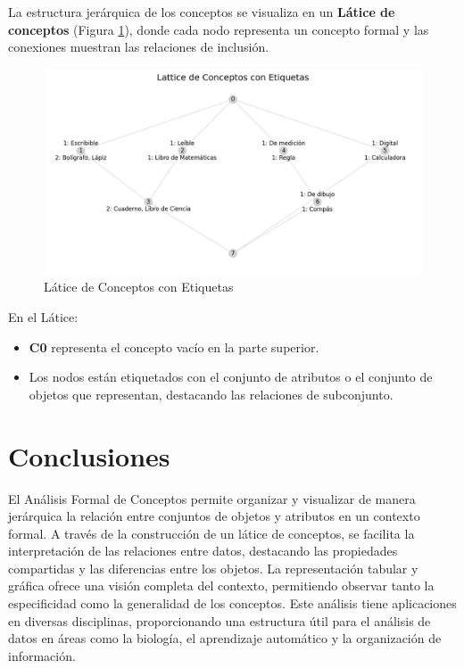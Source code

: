 La estructura jerárquica de los conceptos se visualiza en un \textbf{Látice de conceptos} (Figura \ref{fig:lattice_view}), donde cada nodo representa un concepto formal y las conexiones muestran las relaciones de inclusión.

\begin{figure}[H]
  \centering
  \includegraphics[width=\textwidth]{Figures/1. Content/lattice_view.png}
  \caption{Látice de Conceptos con Etiquetas}
  \label{fig:lattice_view}
\end{figure}

En el Látice:
\begin{itemize}
    \item \textbf{C0} representa el concepto vacío en la parte superior.
    \item Los nodos están etiquetados con el conjunto de atributos o el conjunto de objetos que representan, destacando las relaciones de subconjunto.
\end{itemize}

\section{Conclusiones}

El Análisis Formal de Conceptos permite organizar y visualizar de manera jerárquica la relación entre conjuntos de objetos y atributos en un contexto formal. A través de la construcción de un látice de conceptos, se facilita la interpretación de las relaciones entre datos, destacando las propiedades compartidas y las diferencias entre los objetos. La representación tabular y gráfica ofrece una visión completa del contexto, permitiendo observar tanto la especificidad como la generalidad de los conceptos. Este análisis tiene aplicaciones en diversas disciplinas, proporcionando una estructura útil para el análisis de datos en áreas como la biología, el aprendizaje automático y la organización de información.
